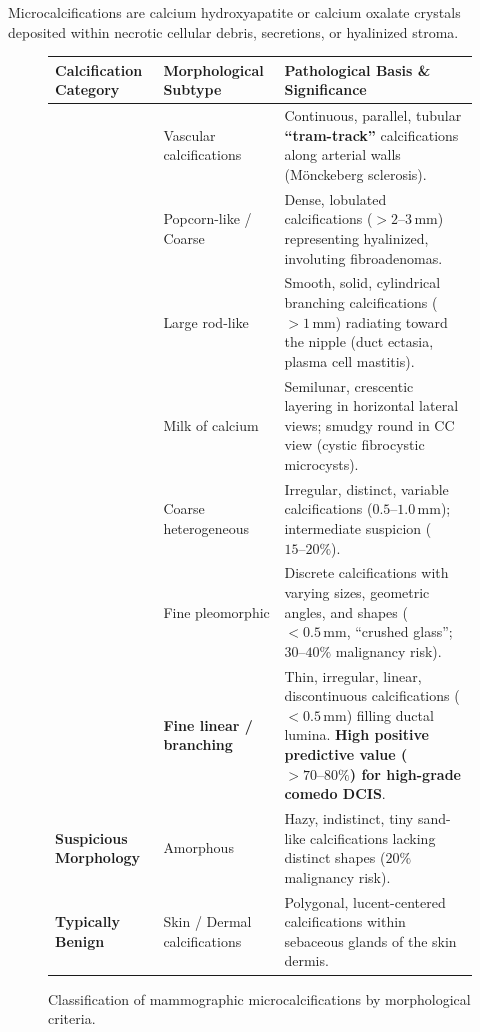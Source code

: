 \documentclass[11pt,a4paper]{article}
\begin{document}
Microcalcifications are calcium hydroxyapatite or calcium oxalate crystals deposited within necrotic cellular debris, secretions, or hyalinized stroma.

\begin{figure}[htbp]
\centering
\setlength{\tabcolsep}{4pt}
\begin{tabular}{p{3.5cm}p{5.5cm}p{5.5cm}}
\toprule
\textbf{Calcification Category} & \textbf{Morphological Subtype} & \textbf{Pathological Basis \& Significance} \\
\midrule
& Vascular calcifications & Continuous, parallel, tubular \textbf{``tram-track''} calcifications along arterial walls (Mönckeberg sclerosis). \\
\addlinespace
& Popcorn-like / Coarse & Dense, lobulated calcifications ($> 2\text{--}3\,\text{mm}$) representing hyalinized, involuting fibroadenomas. \\
\addlinespace
& Large rod-like & Smooth, solid, cylindrical branching calcifications ($> 1\,\text{mm}$) radiating toward the nipple (duct ectasia, plasma cell mastitis). \\
\addlinespace
& Milk of calcium & Semilunar, crescentic layering in horizontal lateral views; smudgy round in CC view (cystic fibrocystic microcysts). \\
\addlinespace
& Coarse heterogeneous & Irregular, distinct, variable calcifications ($0.5\text{--}1.0\,\text{mm}$); intermediate suspicion ($15\text{--}20\%$). \\
\midrule
& Fine pleomorphic & Discrete calcifications with varying sizes, geometric angles, and shapes ($< 0.5\,\text{mm}$, ``crushed glass''; $30\text{--}40\%$ malignancy risk). \\
\addlinespace
& \textbf{Fine linear / branching} & Thin, irregular, linear, discontinuous calcifications ($< 0.5\,\text{mm}$) filling ductal lumina. \textbf{High positive predictive value ($> 70\text{--}80\%$) for high-grade comedo DCIS}. \\
\addlinespace
\textbf{Suspicious Morphology} & Amorphous & Hazy, indistinct, tiny sand-like calcifications lacking distinct shapes ($20\%$ malignancy risk). \\
\addlinespace
\textbf{Typically Benign} & Skin / Dermal calcifications & Polygonal, lucent-centered calcifications within sebaceous glands of the skin dermis. \\
\bottomrule
\end{tabular}
\caption{Classification of mammographic microcalcifications by morphological criteria.}
\label{tab:calcifications}
\end{figure}
\end{document}
